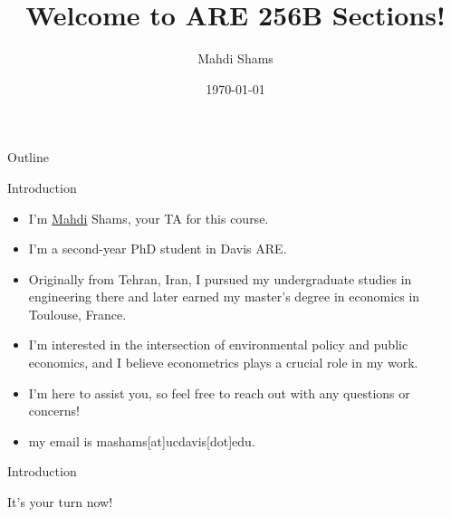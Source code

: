 \documentclass{beamer}
\title{Welcome to ARE 256B Sections!}
\author{Mahdi Shams}
\date{\today}
\begin{document}
\begin{frame}
\titlepage 
\end{frame}


\begin{frame}{Outline}
\tableofcontents
\end{frame}

\begin{frame}{Introduction}
\begin{itemize}
\item I'm \href{https://www.youtube.com/watch?v=J9wRl5TVFvc}{Mahdi} Shams,
 your TA for this course. 
\item I'm a second-year PhD student in Davis ARE. 
\item Originally from Tehran, Iran, I pursued my undergraduate studies in 
engineering there and later earned my master's degree in economics in 
Toulouse, France.
\item I'm interested in the intersection of environmental policy and public 
economics, and I believe econometrics plays a crucial role in my work. 
  
  
  \item I'm here to assist you, so feel free to reach out with any questions or 
concerns!
 \item my email is mashams[at]ucdavis[dot]edu.
  
\end{itemize}

\end{frame}
\begin{frame}{Introduction}
\begin{center}
\Huge It's your turn now!
\end{center}

\end{frame} 
\end{document}
